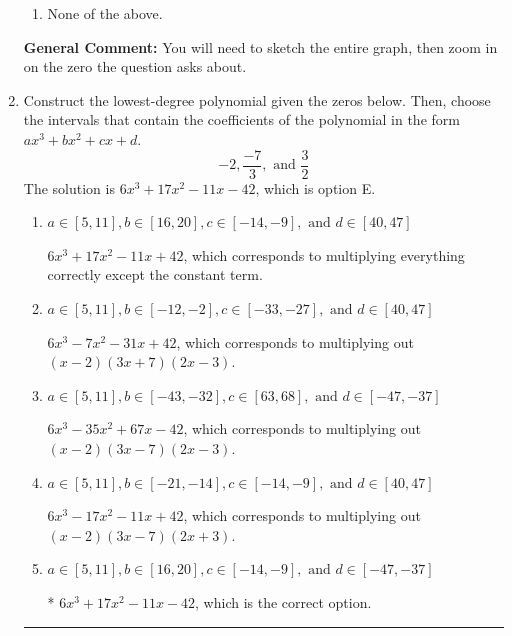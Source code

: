 \documentclass{extbook}[14pt]
\newcommand{\litem}[1]{\item #1

\rule{\textwidth}{0.4pt}}
\begin{document}
\begin{enumerate}
{\begin{enumerate}[label=\Alph*.]
\item None of the above.\end{enumerate}
\textbf{General Comment:} You will need to sketch the entire graph, then zoom in on the zero the question asks about.
}
\litem{
Construct the lowest-degree polynomial given the zeros below. Then, choose the intervals that contain the coefficients of the polynomial in the form $ax^3+bx^2+cx+d$.
\[ -2, \frac{-7}{3}, \text{ and } \frac{3}{2} \]The solution is \( 6x^{3} +17 x^{2} -11 x -42 \), which is option E.\begin{enumerate}[label=\Alph*.]
\item \( a \in [5, 11], b \in [16, 20], c \in [-14, -9], \text{ and } d \in [40, 47] \)

$6x^{3} +17 x^{2} -11 x + 42$, which corresponds to multiplying everything correctly except the constant term.
\item \( a \in [5, 11], b \in [-12, -2], c \in [-33, -27], \text{ and } d \in [40, 47] \)

$6x^{3} -7 x^{2} -31 x + 42$, which corresponds to multiplying out $(x -2)(3x + 7)(2x -3)$.
\item \( a \in [5, 11], b \in [-43, -32], c \in [63, 68], \text{ and } d \in [-47, -37] \)

$6x^{3} -35 x^{2} +67 x -42$, which corresponds to multiplying out $(x -2)(3x -7)(2x -3)$.
\item \( a \in [5, 11], b \in [-21, -14], c \in [-14, -9], \text{ and } d \in [40, 47] \)

$6x^{3} -17 x^{2} -11 x + 42$, which corresponds to multiplying out $(x -2)(3x -7)(2x + 3)$.
\item \( a \in [5, 11], b \in [16, 20], c \in [-14, -9], \text{ and } d \in [-47, -37] \)

* $6x^{3} +17 x^{2} -11 x -42$, which is the correct option.
\end{enumerate}

}
\end{enumerate}
\end{document}
